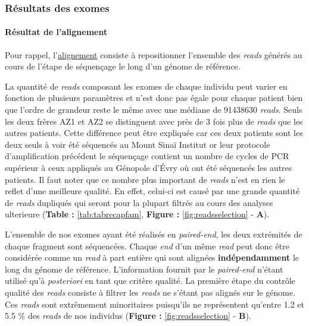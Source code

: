 \documentclass[12pt,twoside]{reedthesis}
\theoremstyle{definition}
\theoremstyle{definition}
\theoremstyle{remark}
\begin{document}
  \newpage  
  
  \subsubsection{Résultats des exomes}\label{resultats-des-exomes}
  
  \paragraph{Résultat de l'alignement}\label{resultat-de-lalignement}
  
  Pour rappel, l'\href{\%7B\#lalignement\%7D}{alignement} consiste à
  repositionner l'ensemble des \emph{reads} générés au cours de l'étape de
  séquençage le long d'un génome de référence.
  
  La quantité de \emph{reads} composant les exomes de chaque individu peut
  varier en fonction de plusieurs paramètres et n'est donc pas égale pour
  chaque patient bien que l'ordre de grandeur reste le même avec une
  médiane de 91438630 \emph{reads}. Seuls les deux frères AZ1 et AZ2 se
  distinguent avec près de 3 fois plus de \emph{reads} que les autres
  patients. Cette différence peut être expliquée car ces deux patients
  sont les deux seuls à voir été séquencés au Mount Sinaï Institut or leur
  protocole d'amplification précédent le séquençage contient un nombre de
  cycles de PCR supérieur à ceux appliqués au Génopole d'Évry où ont été
  séquencés les autres patients. Il faut noter que ce nombre plus
  important de \emph{reads} n'est en rien le reflet d'une meilleure
  qualité. En effet, celui-ci est causé par une grande quantité de
  \emph{reads} dupliqués qui seront pour la plupart filtrés au cours des
  analyses ulterieure (\textbf{Table :} \ref{tab:tabrecapfam},
  \textbf{Figure : }\ref{fig:readsselection} - \textbf{A}).
  
  L'ensemble de nos exomes ayant été réalisés en \emph{paired-end}, les
  deux extrémités de chaque fragment sont séquencées. Chaque \emph{end}
  d'un même \emph{read} peut donc être considérée comme un \emph{read} à
  part entière qui sont alignées \textbf{indépendamment} le long du génome
  de référence. L'information fournit par le \emph{paired-end} n'étant
  utilisé qu'à \emph{posteriori} en tant que critère qualité. La première
  étape du contrôle qualité des \emph{reads} consiste à filtrer les
  \emph{reads} ne s'étant pas alignés sur le génome. Ces \emph{reads} sont
  extrêmement minoritaires puisqu'ils ne représentent qu'entre 1.2 et 5.5
  \% des \emph{reads} de nos individus (\textbf{Figure :
  }\ref{fig:readsselection} - \textbf{B}).
  
\end{document}
